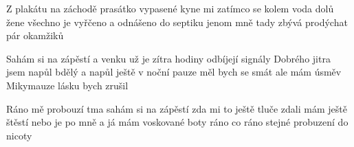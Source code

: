 \documentclass{song}
\begin{document}
\begin{multicols}{2}
\strophe*
Z plakátu na záchodě prasátko vypasené
kyne mi zatímco se kolem voda dolů žene
všechno je vyřčeno a odnášeno do septiku
jenom mně tady zbývá prodýchat pár okamžiků
\endstrophe

Sahám si na zápěstí a venku už je zítra
hodiny odbíjejí signály Dobrého jitra
jsem napůl bdělý a napůl ještě v noční pauze
měl bych se smát ale mám úsměv Mikymauze
lásku bych zrušil
\endstrophe

\strophe*
Ráno mě probouzí tma sahám si na zápěstí
zda mi to ještě tluče zdali mám ještě štěstí
nebo je po mně a já mám voskované boty
ráno co ráno stejné probuzení do nicoty
\endstrophe

\end{multicols}

\end{document}
